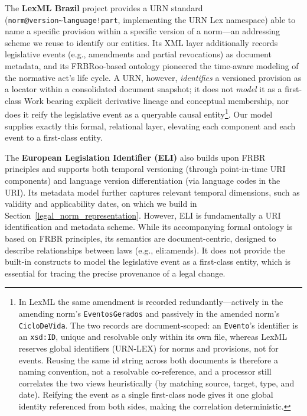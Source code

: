 \documentclass[11pt]{article}
\begin{document}
The \textbf{LexML Brazil} project \cite{lexml2008modelo} provides a URN standard (\texttt{norm@version\textasciitilde language!part}, implementing the URN Lex namespace) able to name a specific provision within a specific version of a norm---an addressing scheme we reuse to identify our entities. Its XML layer additionally records legislative events (e.g., amendments and partial revocations) as document metadata, and its FRBRoo-based ontology \cite{lima2008ontology} pioneered the time-aware modeling of the normative act's life cycle. A URN, however, \emph{identifies} a versioned provision as a locator within a consolidated document snapshot; it does not \emph{model} it as a first-class Work bearing explicit derivative lineage and conceptual membership, nor does it reify the legislative event as a queryable causal entity\footnote{In LexML the same amendment is recorded redundantly---actively in the amending norm's \texttt{EventosGerados} and passively in the amended norm's \texttt{CicloDeVida}. The two records are document-scoped: an \texttt{Evento}'s identifier is an \texttt{xsd:ID}, unique and resolvable only within its own file, whereas LexML reserves global identifiers (URN-LEX) for norms and provisions, not for events. Reusing the same id string across both documents is therefore a naming convention, not a resolvable co-reference, and a processor still correlates the two views heuristically (by matching source, target, type, and date). Reifying the event as a single first-class node gives it one global identity referenced from both sides, making the correlation deterministic.}. Our model supplies exactly this formal, relational layer, elevating each component and each event to a first-class entity.

The \textbf{European Legislation Identifier (ELI)} \cite{eli2014standard} also builds upon FRBR principles and supports both temporal versioning (through point-in-time URI components) and language version differentiation (via language codes in the URI). Its metadata model further captures relevant temporal dimensions, such as validity and applicability dates, on which we build in Section~\ref{legal_norm_representation}. However, ELI is fundamentally a URI identification and metadata scheme. While its accompanying formal ontology is based on FRBR principles, its semantics are document-centric, designed to describe relationships between laws (e.g., eli:amends). It does not provide the built-in constructs to model the legislative event as a first-class entity, which is essential for tracing the precise provenance of a legal change.
\end{document}
